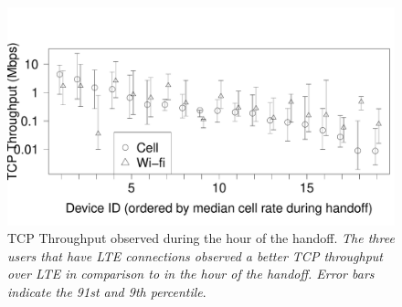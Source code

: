 \begin{figure}[t]
\includegraphics[width=\columnwidth]{plots/handoff_rates.pdf}
\caption{TCP Throughput observed during the hour of the handoff. \emph{The three users that have LTE connections observed a better TCP throughput over LTE in comparison to \wifi in the hour of the handoff. Error bars indicate the 91st and 9th percentile}.}
\label{fig:compare-handoff}
\end{figure}





